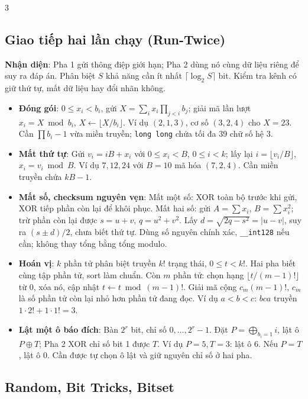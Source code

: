 \documentclass[landscape, 8pt, a4paper, oneside]{extarticle}
\begin{document}
\begin{multicols}{3}
\subsection{Giao tiếp hai lần chạy (Run-Twice)}
\textbf{Nhận diện}: Pha 1 gửi thông điệp giới hạn; Pha 2 dùng nó cùng dữ liệu riêng để suy ra đáp án. Phân biệt $S$ khả năng cần ít nhất $\lceil\log_2 S\rceil$ bit. Kiểm tra kênh có giữ thứ tự, mất dữ liệu hay đổi nhãn không.
\begin{itemize}
    \setlength{\itemsep}{0pt}
    \setlength{\parsep}{0pt}
    \item \textbf{Đóng gói}: $0\le x_i<b_i$, gửi $X=\sum_i x_i\prod_{j<i}b_j$; giải mã lần lượt $x_i=X\bmod b_i$, $X\gets\lfloor X/b_i\rfloor$. Ví dụ $(2,1,3)$, cơ số $(3,2,4)$ cho $X=23$. Cần $\prod b_i-1$ vừa miền truyền; \texttt{long long} chứa tối đa 39 chữ số hệ 3.
    \item \textbf{Mất thứ tự}: Gửi $v_i=iB+x_i$ với $0\le x_i<B$, $0\le i<k$; lấy lại $i=\lfloor v_i/B\rfloor$, $x_i=v_i\bmod B$. Ví dụ $7,12,24$ với $B=10$ mã hóa $(7,2,4)$. Cần miền truyền chứa $kB-1$.
    \item \textbf{Mất số, checksum nguyên vẹn}: Mất một số: XOR toàn bộ trước khi gửi, XOR tiếp phần còn lại để khôi phục. Mất hai số: gửi $A=\sum x_i$, $B=\sum x_i^2$; trừ phần còn lại được $s=u+v$, $q=u^2+v^2$. Lấy $d=\sqrt{2q-s^2}=|u-v|$, suy ra $(s\pm d)/2$, chưa biết thứ tự. Dùng số nguyên chính xác, \texttt{\_\_int128} nếu cần; không thay tổng bằng tổng modulo.
    \item \textbf{Hoán vị}: $k$ phần tử phân biệt truyền $k!$ trạng thái, $0\le t<k!$. Hai pha biết cùng tập phần tử, sort làm chuẩn. Còn $m$ phần tử: chọn hạng $\lfloor t/(m-1)!\rfloor$ từ 0, xóa nó, cập nhật $t\gets t\bmod(m-1)!$. Giải mã cộng $c_m(m-1)!$, $c_m$ là số phần tử còn lại nhỏ hơn phần tử đang đọc. Ví dụ $a<b<c$: $bca$ truyền $1\cdot2!+1\cdot1!=3$.
    \item \textbf{Lật một ô báo đích}: Bàn $2^r$ bit, chỉ số $0,\ldots,2^r-1$. Đặt $P=\bigoplus_{b_i=1}i$, lật ô $P\oplus T$; Pha 2 XOR chỉ số bit 1 được $T$. Ví dụ $P=5,T=3$: lật ô 6. Nếu $P=T$, lật ô 0. Cần được tự chọn ô lật và giữ nguyên chỉ số ở hai pha.
\end{itemize}

\subsection{Random, Bit Tricks, Bitset}
\inputminted[]{cpp}{source/cpp/utility/bit_tricks.cpp}


\end{multicols}
\end{document}
